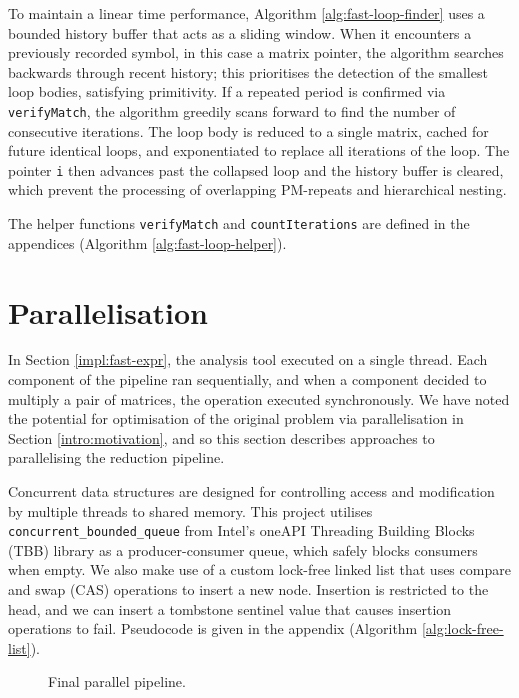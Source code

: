 To maintain a linear time performance, Algorithm \ref{alg:fast-loop-finder}
uses a bounded history buffer that acts as a sliding window.
When it encounters a previously recorded symbol, in this case a matrix pointer, the algorithm searches backwards 
through recent history; this prioritises the detection of the smallest loop bodies, satisfying primitivity.
If a repeated period is confirmed via \verb|verifyMatch|, the algorithm greedily scans forward to find the number of consecutive
iterations. The loop body is reduced to a single matrix, cached for future identical loops, and exponentiated to replace
all iterations of the loop. The pointer \verb|i| then advances past the collapsed loop and the history buffer is cleared,
which prevent the processing of overlapping PM-repeats and hierarchical nesting.

The helper functions \verb|verifyMatch| and \verb|countIterations| are defined in the appendices (Algorithm \ref{alg:fast-loop-helper}).

\FloatBarrier

\section{Parallelisation} \label{impl:parallelisation}

In Section \ref{impl:fast-expr}, the analysis tool executed on a single thread.
Each component of the pipeline ran sequentially, and when
a component decided to multiply a pair of matrices, the operation executed synchronously. We have noted the potential 
for optimisation of the original problem via parallelisation in Section \ref{intro:motivation},
and so this section describes approaches to parallelising the reduction pipeline.

Concurrent data structures are designed for controlling access and modification by multiple threads to shared memory.
This project utilises \verb|concurrent_bounded_queue| from Intel's oneAPI Threading Building Blocks (TBB) library
as a producer-consumer queue, which safely blocks consumers when empty.
We also make use of a custom lock-free linked list that uses compare and swap (CAS) operations to insert a new node.
Insertion is restricted to the head, and we can insert a tombstone sentinel value that causes insertion operations 
to fail. Pseudocode is given in the appendix (Algorithm \ref{alg:lock-free-list}).

\begin{figure}[H] 
\centering 

\caption{Final parallel pipeline.}
\label{fig:multi-threaded-pipeline}
\end{figure}
\FloatBarrier

